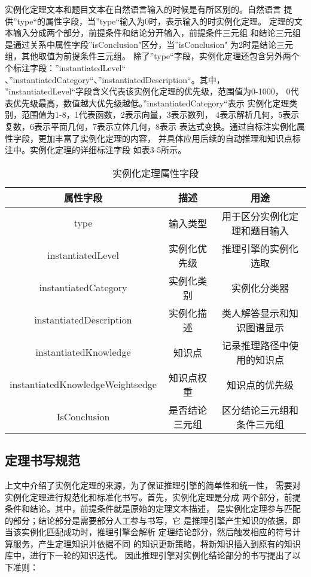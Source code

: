 \documentclass{standalone}
\begin{document}
实例化定理文本和题目文本在自然语言输入的时候是有所区别的。自然语言
提供”type“的属性字段，当”type“输入为0时，表示输入的时实例化定理。
定理的文本输入分成两个部分，前提条件和结论分开输入，前提条件三元组
和结论三元组是通过关系中属性字段”isConclusion"区分，当”isConclusion"
为2时是结论三元组，其他取值为前提条件三元组。
除了”type“字段，实例化定理还包含另外两个个标注字段：”instantiatedLevel“
、”instantiatedCategory“、”instantiatedDescription“。其中，
”instantiatedLevel“字段含义代表该实例化定理的优先级，范围值为0-1000，
0代表优先级最高，数值越大优先级越低。”instantiatedCategory“表示
实例化定理类别，范围值为1-8，1代表函数，2表示向量，3表示数列，
4表示解析几何，5表示复数，6表示平面几何，7表示立体几何，8表示
表达式变换。通过自标注实例化属性字段，更加丰富了实例化定理的内容，
并具体应用后续的自动推理和知识点标注中。实例化定理的详细标注字段
如表3-5所示。 

\begin{table}[h]
	\caption{实例化定理属性字段} 
	\begin{tabular}{|c|c|c|} 
		\hline  
		属性字段 & 描述 & 用途 \\
		\hline 
		type & 输入类型 & 用于区分实例化定理和题目输入\\  
		\hline  
		instantiatedLevel & 实例化优先级 & 推理引擎的实例化选取 \\  
		\hline  
		instantiatedCategory & 实例化类别 & 实例化分类器 \\  
		\hline 
		instantiatedDescription & 实例化描述 & 类人解答显示和知识图谱显示 \\  
		\hline 
		instantiatedKnowledge & 知识点 & 记录推理路径中使用的知识点 \\  
		\hline  
		instantiatedKnowledgeWeightsedge & 知识点权重 & 知识点的优先级 \\  
		\hline  
		IsConclusion & 是否结论三元组 & 区分结论三元组和条件三元组 \\  
		\hline 
	\end{tabular}
	\label{tablea}
\end{table}

\subsection{定理书写规范}
上文中介绍了实例化定理的来源，为了保证推理引擎的简单性和统一性，
需要对实例化定理进行规范化和标准化书写。首先，实例化定理是分成
两个部分，前提条件和结论。其中，前提条件就是原始的定理文本描述，
是实例化定理参与匹配的部分；结论部分是需要部分人工参与书写，它
是推理引擎产生知识的依据，即当该实例化匹配成功时，推理引擎会解析
定理结论部分，然后触发相应的符号计算服务，产生定理知识并依据不同
的知识更新策略，将新知识插入到原有的知识库中，进行下一轮的知识迭代。
因此推理引擎对实例化结论部分的书写提出了以下准则：
\end{document}
